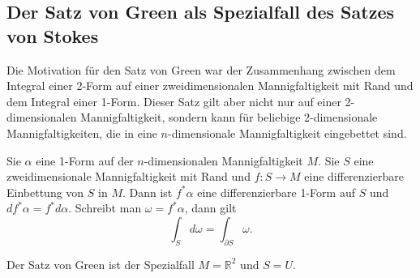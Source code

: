 %
%
\subsection{Der Satz von Green als Spezialfall des Satzes von Stokes}
Die Motivation für den Satz von Green war der Zusammenhang zwischen
dem Integral einer 2-Form auf einer zweidimensionalen Mannigfaltigkeit
mit Rand und dem Integral einer 1-Form.
Dieser Satz gilt aber nicht nur auf einer 2-dimensionalen Mannigfaltigkeit,
sondern kann für beliebige 2-dimensionale Mannigfaltigkeiten, die in
eine $n$-dimensionale Mannigfaltigkeit eingebettet sind.

\begin{satz}[Stokes]
\label{buch:green:green:satz:stokes}
Sie $\alpha$ eine 1-Form auf der $n$-dimensionalen Mannigfaltigkeit $M$.
Sie $S$ eine zweidimensionale Mannigfaltigkeit mit Rand und
$f\colon S\to M$ eine differenzierbare Einbettung von $S$ in $M$.
Dann ist $f^*\alpha$ eine differenzierbare 1-Form auf $S$ und
$df^*\alpha=f^*d\alpha$.
Schreibt man $\omega=f^*\alpha$,
dann gilt
\[
\int_S d\omega
=
\int_{\partial S}\omega.
\]
\end{satz}

Der Satz von Green ist der Spezialfall $M=\mathbb{R}^2$ und $S=U$.

